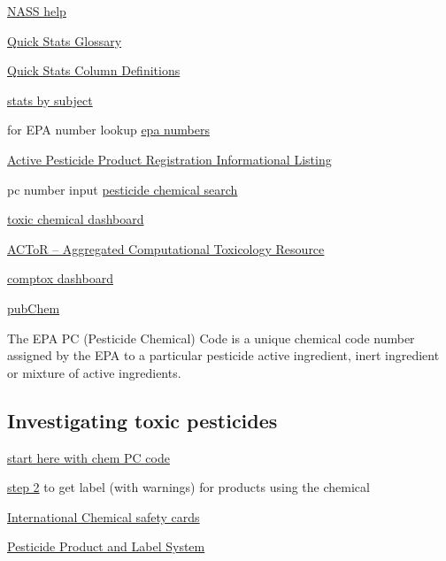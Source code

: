 \documentclass[
  letterpaper,
  DIV=11,
  numbers=noendperiod]{scrartcl}
\begin{document}
\href{https://quickstats.nass.usda.gov/tutorials}{NASS help}

\href{https://quickstats.nass.usda.gov/src/glossary.pdf}{Quick Stats
Glossary}

\href{https://quickstats.nass.usda.gov/param_define}{Quick Stats Column
Definitions}

\href{https://www.nass.usda.gov/Statistics_by_Subject/index.php?sector=CROPS}{stats
by subject}

for EPA number lookup
\href{https://archive.epa.gov/pesticides/chemicalsearch/chemical/foia/web/html/128810.html}{epa
numbers}

\href{https://ordspub.epa.gov/ords/pesticides/f?p=APPRIL_PUBLIC:2::::::}{Active
Pesticide Product Registration Informational Listing}

pc number input
\href{https://ordspub.epa.gov/ords/pesticides/f?p=chemicalsearch:1}{pesticide
chemical search}

\href{https://comptox.epa.gov/dashboard/}{toxic chemical dashboard}

\href{https://cfpub.epa.gov/si/si_public_record_report.cfm?Lab=NCCT\&dirEntryId=209598}{ACToR
-- Aggregated Computational Toxicology Resource}

\href{https://comptox.epa.gov/dashboard/chemical/details/DTXSID0020315}{comptox
dashboard}

\href{https://pubchem.ncbi.nlm.nih.gov/}{pubChem}

The EPA PC (Pesticide Chemical) Code is a unique chemical code number
assigned by the EPA to a particular pesticide active ingredient, inert
ingredient or mixture of active ingredients.

\hypertarget{investigating-toxic-pesticides}{%
\subsection{Investigating toxic
pesticides}\label{investigating-toxic-pesticides}}

\href{https://ordspub.epa.gov/ords/pesticides/f?p=chemicalsearch:1}{start
here with chem PC code}

\href{https://ordspub.epa.gov/ords/pesticides/f?p=113:1::::RP,17,1::}{step
2} to get label (with warnings) for products using the chemical

\href{https://www.ilo.org/dyn/icsc/showcard.home}{International Chemical
safety cards}

\href{https://ordspub.epa.gov/ords/pesticides/f?p=113:1::::RP,17,1::}{Pesticide
Product and Label System}
\end{document}
